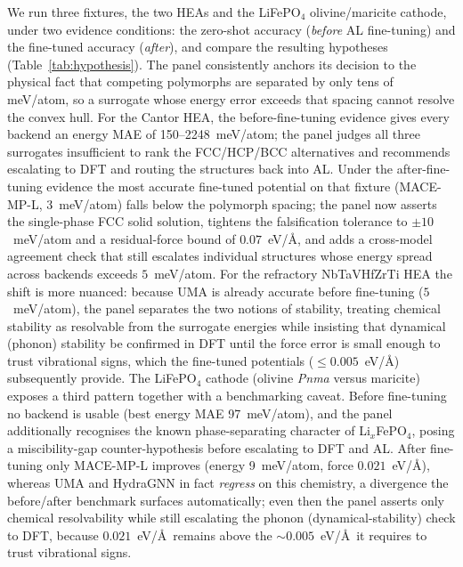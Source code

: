 \documentclass[conference]{IEEEtran}
\def\acs#1{#1}%
\begin{document}
We run three fixtures, the two \acs{HEA}s and the LiFePO$_4$ olivine/maricite
cathode, under two evidence conditions: the zero-shot
accuracy (\emph{before} \acs{AL} fine-tuning) and the fine-tuned accuracy
(\emph{after}), and compare the resulting hypotheses (Table~\ref{tab:hypothesis}).
The panel consistently anchors its decision to the physical fact that competing
polymorphs are separated by only tens of meV/atom, so a surrogate whose energy
error exceeds that spacing cannot resolve the convex hull. For the Cantor
\acs{HEA}, the before-fine-tuning evidence gives every backend an energy
\acs{MAE} of 150--2248~meV/atom; the panel judges all three surrogates
insufficient to rank the FCC/HCP/BCC alternatives and recommends escalating to
\acs{DFT} and routing the structures back into \acs{AL}. Under the
after-fine-tuning evidence the most accurate fine-tuned potential on that
fixture (MACE-MP-L, 3~meV/atom) falls below the polymorph spacing; the panel now
asserts the single-phase FCC solid solution, tightens the falsification
tolerance to $\pm 10$~meV/atom and a residual-force bound of $0.07$~eV/\AA, and
adds a cross-model agreement check that still escalates individual structures
whose energy spread across backends exceeds $5$~meV/atom. For the refractory
NbTaVHfZrTi \acs{HEA} the shift is more nuanced: because UMA is already accurate
before fine-tuning ($5$~meV/atom), the panel separates the two notions of
stability, treating chemical stability as resolvable from the surrogate energies
while insisting that dynamical (phonon) stability be confirmed in \acs{DFT}
until the force error is small enough to trust vibrational signs, which the
fine-tuned potentials ($\le\!0.005$~eV/\AA) subsequently provide. The
LiFePO$_4$ cathode (olivine \emph{Pnma} versus maricite) exposes a third pattern
together with a benchmarking caveat. Before fine-tuning no backend is usable (best
energy \acs{MAE} 97~meV/atom), and the panel additionally recognises the known
phase-separating character of Li$_x$FePO$_4$, posing a miscibility-gap
counter-hypothesis before escalating to \acs{DFT} and \acs{AL}. After
fine-tuning only MACE-MP-L improves (energy 9~meV/atom, force $0.021$~eV/\AA),
whereas UMA and HydraGNN in fact \emph{regress} on this chemistry, a divergence
the before/after benchmark surfaces automatically; even then the panel asserts
only chemical resolvability while still escalating the phonon (dynamical-stability)
check to \acs{DFT}, because $0.021$~eV/\AA\ remains above the
$\sim\!0.005$~eV/\AA\ it requires to trust vibrational signs.
\end{document}
